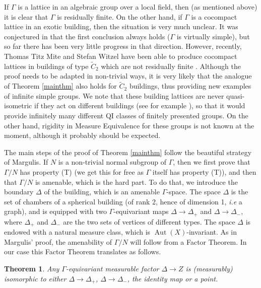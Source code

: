 \documentclass[a4paper, 11pt]{article}
\theoremstyle{plain}
\newtheorem{theorem}[proposition]{Theorem}
\theoremstyle{definition}
\theoremstyle{remark}
\DeclareMathOperator{\Aut}{Aut}
\begin{document}
If $\Gamma$ is a lattice in an algebraic group over a local field, then (as mentioned above) it is clear that $\Gamma$ is residually finite. On the other hand, if $\Gamma$ is a cocompact lattice in an exotic building, then the situation is very much unclear. It was conjectured in \cite[Conjecture 1.5]{BCL} that the first conclusion always holds ($\Gamma$ is virtually simple), but so far there has been very little progress in that direction. However, recently, Thomas Titz Mite and Stefan Witzel have been able to produce cocompact lattices in buildings of type $\tilde C_2$ which are not residually finite \cite{MiteWitzel}. Although the proof needs to be adapted in non-trivial ways, it is very likely that the analogue of Theorem \ref{mainthm} also holds for $\tilde C_2$ buildings, thus providing new  examples of infinite simple groups. We note that these building lattices are never quasi-isometric if they act on different buildings (see for example \cite{KramerWeiss}), so that it would provide infinitely many different QI classes of finitely presented groups. On the other hand, rigidity in Measure Equivalence for these groups is not known at the moment, although it probably should be expected.

\medskip

The main steps of the proof of Theorem \ref{mainthm} follow the beautiful strategy of Margulis. If $N$ is a non-trivial normal subgroup of $\Gamma$, then we first prove that $\Gamma/N$ has property (T) (we get this for free as $\Gamma$ itself has property (T)), and then that $\Gamma/N$ is amenable, which is the hard part. To do that, we introduce the boundary $\Delta$ of the building, which is an amenable $\Gamma$-space. The space $\Delta$ is the set of chambers of a spherical building (of rank 2, hence of dimension 1, \textit{i.e} a graph), and is equipped with two $\Gamma$-equivariant maps $\Delta\to \Delta_+$ and $\Delta\to \Delta_-$, where $\Delta_+$ and $\Delta_-$ are the two sets of vertices of different types. The space $\Delta$ is endowed with a natural measure class, which is $\Aut(X)$-invariant. As in Margulis' proof, the amenability of $\Gamma/N$ will follow from a Factor Theorem. In our case this Factor Theorem translates as follows.

\begin{theorem}\label{thm:factor}
    Any $\Gamma$-equivariant measurable factor $\Delta\to Z$ is (measurably) isomorphic to either $\Delta\to \Delta_+$, $\Delta\to \Delta_-$, the identity map or a point.
\end{theorem}
\end{document}
